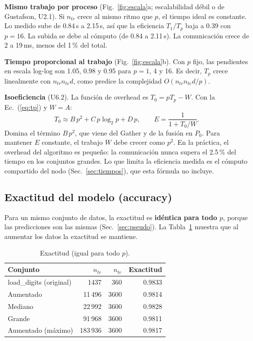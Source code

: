\documentclass[11pt,a4paper]{article}
\newcommand{\ntr}{n_{tr}}
\newcommand{\nte}{n_{te}}
\begin{document}
\textbf{Mismo trabajo por proceso} (Fig.~\ref{fig:escala}a; escalabilidad débil o de Gustafson, U2.1). Si $\ntr$ crece al mismo ritmo que $p$, el tiempo ideal es constante. Lo medido sube de 0.84\,s a 2.15\,s, así que la eficiencia $T_1/T_p$ baja a 0.39 con $p=16$. La subida se debe al cómputo (de 0.84 a 2.11\,s). La comunicación crece de 2 a 19\,ms, menos del 1\,\% del total.

\textbf{Tiempo proporcional al trabajo} (Fig.~\ref{fig:escala}b). Con $p$ fijo, las pendientes en escala log-log son 1.05, 0.98 y 0.95 para $p=1$, 4 y 16. Es decir, $T_p$ crece linealmente con $\ntr\nte d$, como predice la complejidad $O(\ntr\nte d/p)$.

\textbf{Isoeficiencia} (U6.2). La función de overhead es $T_0=pT_p-W$. Con la Ec.~(\ref{eq:tp}) y $W=A$:
\[
T_0\approx B\,p^2+C\,p\log_2p+D\,p,\qquad E=\frac{1}{1+T_0/W}.
\]
Domina el término $B\,p^2$, que viene del Gather y de la fusión en $P_0$. Para mantener $E$ constante, el trabajo $W$ debe crecer como $p^2$. En la práctica, el overhead del algoritmo es pequeño: la comunicación nunca supera el 2.5\,\% del tiempo en los conjuntos grandes. Lo que limita la eficiencia medida es el cómputo compartido del nodo (Sec.~\ref{sec:tiempos}), que esta fórmula no incluye.

\subsection{Exactitud del modelo (accuracy)}\label{sec:acc}
Para un mismo conjunto de datos, la exactitud es \textbf{idéntica para todo $p$}, porque las predicciones son las mismas (Sec.~\ref{sec:pseudo}). La Tabla~\ref{tab:acc} muestra que al aumentar los datos la exactitud se mantiene.

\begin{table}[htbp]
\centering\small
\caption{Exactitud (igual para todo $p$).}\label{tab:acc}
\begin{tabular}{@{}lrrr@{}}\toprule
Conjunto & $\ntr$ & $\nte$ & Exactitud\\\midrule
load\_digits (original) & 1437 & 360 & 0.9833\\
Aumentado & 11\,496 & 3600 & 0.9814\\
Mediano & 22\,992 & 3600 & 0.9828\\
Grande & 91\,968 & 3600 & 0.9811\\
Aumentado (máximo) & 183\,936 & 3600 & 0.9817\\\bottomrule
\end{tabular}
\end{table}
\end{document}
